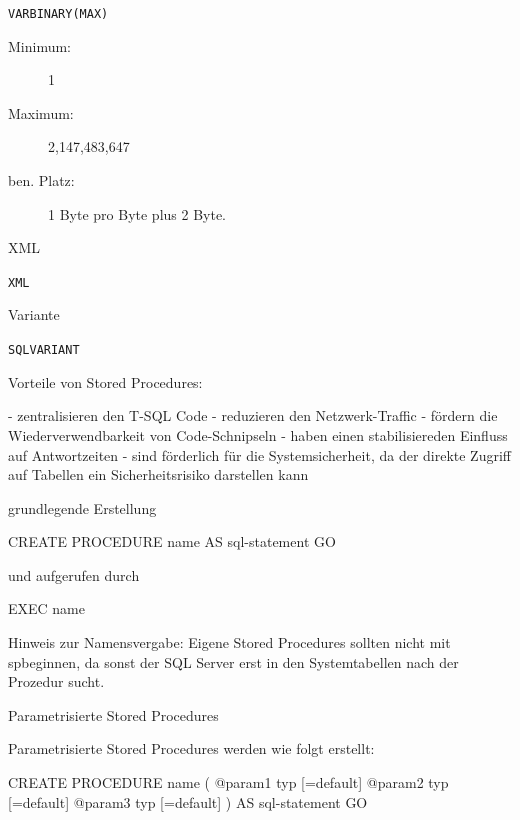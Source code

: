 \documentclass[12pt,ngerman,a4paper,index=totoc,twoside]{scrartcl}
\newcommand{\sql}[1]{\texttt{#1}}
\begin{document}
\begin{compactitem}
\begin{compactitem}
\item \sql{VARBINARY(MAX)}  

 \begin{description}
  	\item[Minimum:] 1
  	\item[Maximum:] 2,147,483,647
  	\item[ben. Platz:] 1 Byte pro Byte plus 2 Byte.
  \end{description}	 

\end{compactitem}
   
\item XML 
\begin{compactitem}
	 \item \sql{XML}  
\end{compactitem}

\item Variante
\begin{compactitem}
 \item \sql{SQL\textunderscore VARIANT}  
\end{compactitem}
\end{compactitem}


Vorteile von Stored Procedures:

      -       zentralisieren den T-SQL Code
      -       reduzieren den Netzwerk-Traffic
      -       fördern die Wiederverwendbarkeit von Code-Schnipseln
      -       haben einen stabilisiereden Einfluss auf Antwortzeiten
      -       sind förderlich für die Systemsicherheit, da der direkte Zugriff auf Tabellen ein Sicherheitsrisiko darstellen kann

grundlegende Erstellung

CREATE PROCEDURE name
AS sql-statement
GO

und aufgerufen durch

EXEC name

Hinweis zur Namensvergabe: Eigene Stored Procedures sollten nicht mit sp\textunderscore beginnen, da sonst der SQL Server erst in den Systemtabellen nach der Prozedur sucht.

Parametrisierte Stored Procedures

Parametrisierte Stored Procedures werden wie folgt erstellt:

CREATE PROCEDURE name
(
@param1 typ [=default]
@param2 typ [=default]
@param3 typ [=default]
)
AS sql-statement
GO
\end{document}
